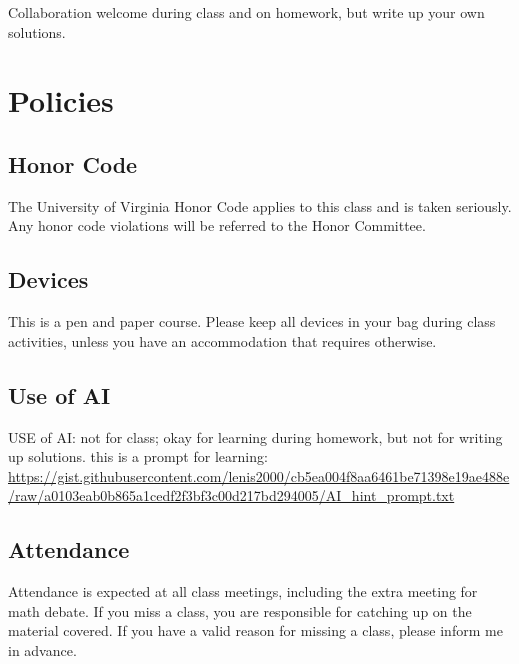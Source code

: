 \documentclass[oneside,11pt]{amsart}
\begin{document}
Collaboration welcome during class and on homework, but write up your own solutions.







\section{Policies}


\subsection{Honor Code}
The University of Virginia Honor Code applies to this class and is taken seriously. Any honor code violations will be referred to the Honor Committee. 

\subsection{Devices}

This is a pen and paper course. Please keep all devices in your bag during class activities, unless you have an accommodation that requires otherwise.

\subsection{Use of AI}

USE of AI: not for class; okay for learning during homework, but not for writing up solutions.
this is a prompt for learning: \url{https://gist.githubusercontent.com/lenis2000/cb5ea004f8aa6461be71398e19ae488e/raw/a0103eab0b865a1cedf2f3bf3c00d217bd294005/AI_hint_prompt.txt}


\subsection{Attendance}

Attendance is expected at all class meetings, including the extra meeting for math debate. If you miss a class, you are responsible for catching up on the material covered. If you have a valid reason for missing a class, please inform me in advance.
\end{document}
